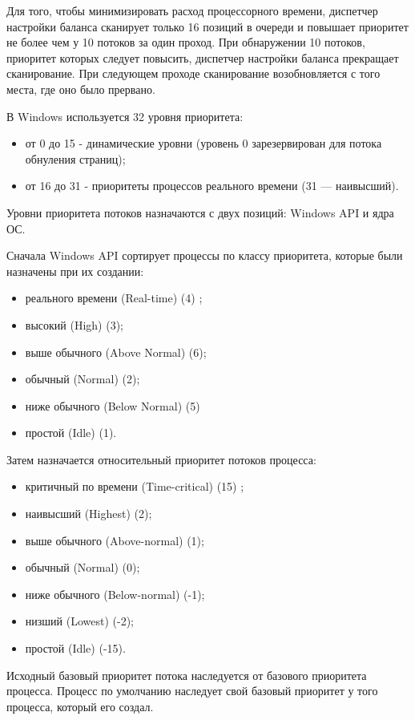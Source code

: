 Для того, чтобы минимизировать расход процессорного времени, диспетчер настройки баланса сканирует только 16 позиций в очереди и повышает приоритет не более чем у 10 потоков за один проход. При обнаружении 10 потоков, приоритет которых следует повысить, диспетчер настройки баланса прекращает сканирование. При следующем проходе сканирование возобновляется с того места, где оно было прервано.

В Windows используется 32 уровня приоритета:
\begin{itemize}
    \item от 0 до 15 - динамические уровни (уровень 0 зарезервирован для потока обнуления страниц);
    \item от 16 до 31 - приоритеты процессов реального времени (31 --- наивысший).
\end{itemize}

Уровни приоритета потоков назначаются с двух позиций: Windows API и ядра ОС.

Сначала Windows API сортирует процессы по классу приоритета, которые были назначены при их создании:

\begin{itemize}
    \item реального времени (Real-time) (4) ;
    \item высокий (High) (3);
    \item выше обычного (Above Normal) (6);
    \item обычный (Normal) (2);
    \item ниже обычного (Below Normal) (5)
    \item простой (Idle) (1).
\end{itemize}

Затем назначается относительный приоритет потоков процесса:

\begin{itemize}
    \item критичный по времени (Time-critical) (15) ;
    \item наивысший (Highest) (2);
    \item выше обычного (Above-normal) (1);
    \item обычный (Normal) (0);
    \item ниже обычного (Below-normal) (-1);
    \item низший (Lowest) (-2);
    \item простой (Idle) (-15).
\end{itemize}

Исходный базовый приоритет потока наследуется от базового приоритета процесса. 
Процесс по умолчанию наследует свой базовый приоритет у того процесса, который его создал. 

